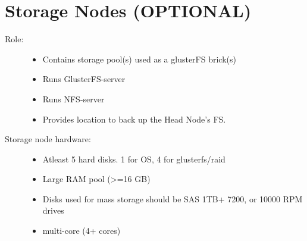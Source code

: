 \documentclass[letterpaper,10pt,english]{sphinxmanual}
\begin{document}
\section{Storage Nodes (OPTIONAL)}
\label{setup:storage-nodes-optional}\begin{description}
\item[{Role:}] \leavevmode\begin{itemize}
\item {} 
Contains storage pool(s) used as a glusterFS brick(s)

\item {} 
Runs GlusterFS-server

\item {} 
Runs NFS-server

\item {} 
Provides location to back up the Head Node's FS.

\end{itemize}

\item[{Storage node hardware:}] \leavevmode\begin{itemize}
\item {} 
Atleast 5 hard disks.  1 for OS, 4 for glusterfs/raid

\item {} 
Large RAM pool (\textgreater{}=16 GB)

\item {} 
Disks used for mass storage should be SAS 1TB+ 7200, or 10000 RPM drives

\item {} 
multi-core (4+ cores)

\end{itemize}

\end{description}
\end{document}
